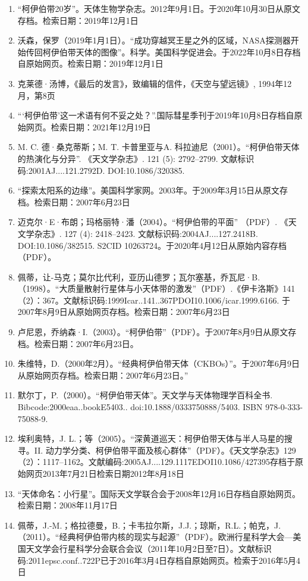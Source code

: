 \begin{enumerate}
\item “柯伊伯带20岁”。天体生物学杂志。2012年9月1日。于2020年10月30日从原文存档。检索日期：2019年12月1日
\item 沃森，保罗（2019年1月1日）。“成功穿越冥王星之外的区域，NASA探测器开始传回柯伊伯带天体的图像”。科学。美国科学促进会。于2022年10月8日存档自原始网页。检索日期：2019年12月1日
\item 克莱德·汤博，《最后的发言》，致编辑的信件，《天空与望远镜》, 1994年12月，第8页
\item “‘柯伊伯带’这一术语有何不妥之处？”.国际彗星季刊于2019年10月8日存档自原始网页。检索日期：2021年12月19日
\item M. C. 德·桑克蒂斯；M. T. 卡普里亚与A. 科拉迪尼（2001）。“柯伊伯带天体的热演化与分异”. 《天文学杂志》. 121 (5): 2792–2799. 文献标识码:2001AJ....121.2792D. DOI:10.1086/320385.
\item “探索太阳系的边缘”。美国科学家网。2003年。于2009年3月15日从原文存档。检索日期：2007年6月23日
\item 迈克尔·E·布朗；玛格丽特·潘（2004）。“柯伊伯带的平面” （PDF）. 《天文学杂志》. 127 (4): 2418–2423. 文献标识码:2004AJ....127.2418B. DOI:10.1086/382515. S2CID 10263724。于2020年4月12日从原始内容存档 （PDF）。
\item 佩蒂，让-马克；莫尔比代利，亚历山德罗；瓦尔塞基，乔瓦尼·B.（1998）。“大质量散射行星体与小天体带的激发”（PDF）.《伊卡洛斯》141（2）：367。文献标识码:1999Icar..141..367PDOI10.1006/icar.1999.6166. 于2007年8月9日从原始网页存档。检索日期：2007年6月23日
\item 卢尼恩，乔纳森·I.（2003）。“柯伊伯带”（PDF）。于2007年8月9日从原文存档。检索日期：2007年6月23日。
\item 朱维特，D.（2000年2月）。“经典柯伊伯带天体（CKBOs）”。于2007年6月9日从原始网页存档。检索日期：2007年6月23日。”
\item 默尔丁，P.（2000）。“柯伊伯带天体”。天文学与天体物理学百科全书. Bibcode:2000eaa..bookE5403.. doi:10.1888/0333750888/5403. ISBN 978-0-333-75088-9.
\item 埃利奥特，J. L.；等（2005）。“深黄道巡天：柯伊伯带天体与半人马星的搜寻。II. 动力学分类、柯伊伯带平面及核心群体”（PDF）。《天文学杂志》129（2）：1117–1162。文献编码:2005AJ....129.1117EDOI10.1086/427395存档于原始网页2013年7月21日检索日期2012年8月18日
\item “天体命名：小行星”。国际天文学联合会于2008年12月16日存档自原始网页。检索日期：2008年11月17日
\item 佩蒂，J.-M.；格拉德曼，B.；卡韦拉尔斯，J.J.；琼斯，R.L.；帕克，J.（2011）。“经典柯伊伯带内核的现实与起源”（PDF）。欧洲行星科学大会—美国天文学会行星科学分会联合会议（2011年10月2日至7日）。文献标识码:2011epsc.conf..722P已于2016年3月4日存档自原始网页。检索于2016年5月4日

\end{enumerate}
